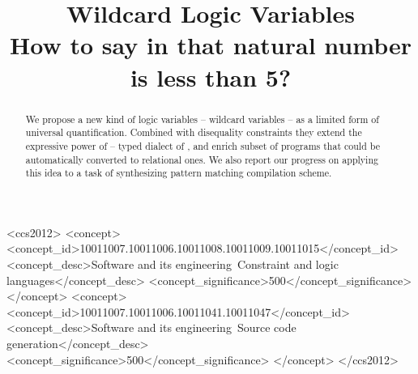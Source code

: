 \documentclass
  [screen
  , sigplan
  , review
  ]{acmart}
\begin{document}
\title{Wildcard Logic Variables\\
  \large How to say in \miniKanren{} that natural number is less than 5? }






%

\begin{abstract}
We propose a new kind of logic variables -- wildcard variables -- as a limited form of universal quantification.
Combined with disequality constraints they extend the expressive power of \OCanren{} -- typed dialect of \miniKanren{}, and enrich subset of \OCaml{} programs that could be automatically converted to relational ones. We also report our progress on applying this idea to a task of synthesizing pattern matching compilation scheme.
\end{abstract}


\begin{CCSXML}
<ccs2012>
<concept>
<concept_id>10011007.10011006.10011008.10011009.10011015</concept_id>
<concept_desc>Software and its engineering~Constraint and logic languages</concept_desc>
<concept_significance>500</concept_significance>
</concept>
<concept>
<concept_id>10011007.10011006.10011041.10011047</concept_id>
<concept_desc>Software and its engineering~Source code generation</concept_desc>
<concept_significance>500</concept_significance>
</concept>
</ccs2012>
\end{CCSXML}
\end{document}
